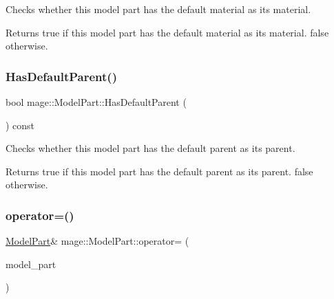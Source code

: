 Checks whether this model part has the default material as its material.

\begin{DoxyReturn}{Returns}
{\ttfamily true} if this model part has the default material as its material. {\ttfamily false} otherwise. 
\end{DoxyReturn}
\hypertarget{structmage_1_1_model_part_a09e744279e58040b2407db9babda583f}{}\label{structmage_1_1_model_part_a09e744279e58040b2407db9babda583f} 
\subsubsection{\texorpdfstring{Has\+Default\+Parent()}{HasDefaultParent()}}
{\footnotesize\ttfamily bool mage\+::\+Model\+Part\+::\+Has\+Default\+Parent (\begin{DoxyParamCaption}{ }\end{DoxyParamCaption}) const\hspace{0.3cm}{\ttfamily [noexcept]}}

Checks whether this model part has the default parent as its parent.

\begin{DoxyReturn}{Returns}
{\ttfamily true} if this model part has the default parent as its parent. {\ttfamily false} otherwise. 
\end{DoxyReturn}
\hypertarget{structmage_1_1_model_part_a37e9d66b701ed84111160bf5a003b658}{}\label{structmage_1_1_model_part_a37e9d66b701ed84111160bf5a003b658} 
\subsubsection{\texorpdfstring{operator=()}{operator=()}\hspace{0.1cm}{\footnotesize\ttfamily [1/2]}}
{\footnotesize\ttfamily \hyperlink{structmage_1_1_model_part}{Model\+Part}\& mage\+::\+Model\+Part\+::operator= (\begin{DoxyParamCaption}\item[{const \hyperlink{structmage_1_1_model_part}{Model\+Part} \&}]{model\+\_\+part }\end{DoxyParamCaption})\hspace{0.3cm}{\ttfamily [default]}}

